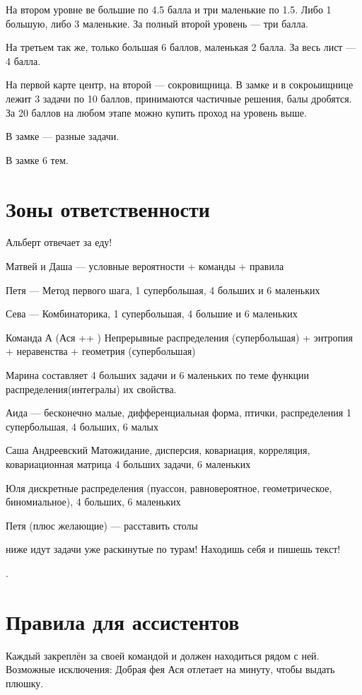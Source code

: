 \documentclass[a4paper,12pt]{article}
\begin{document}
 На втором уровне ве большие по 4.5 балла и три маленькие по 1.5. Либо 1 большую, либо 3 маленькие. 
 За полный второй уровень — три балла.

 На третьем так же, только большая 6 баллов, маленькая 2 балла. За весь лист — 4 балла.

 На первой карте центр, на второй — сокровищница. В замке и в сокроыищнице лежит 3 задачи по 10 баллов, 
 принимаются частичные решения, балы дробятся. За 20 баллов на любом этапе можно купить проход на уровень выше.

 В замке — разные задачи.

 В замке 6 тем. \\


\section*{Зоны ответственности}

Альберт отвечает за еду!

Матвей и Даша — условные вероятности + команды + правила

Петя — Метод первого шага, 1 супербольшая, 4 больших и 6 маленьких

Сева — Комбинаторика, 1 супербольшая, 4 большие и 6 маленьких

Команда А (Ася ++ ) Непрерывные распределения (супербольшая) + энтропия + неравенства + геометрия (супербольшая)

Марина составляет 4 больших задачи и 6 маленьких по теме функции распределения(интегралы) их свойства.

Аида — бесконечно малые, дифференциальная форма, птички, распределения 1 супербольшая, 4 больших, 6 малых

Саша Андреевский Матожидание, дисперсия, ковариация, корреляция, ковариационная матрица 4 больших задачи, 6 маленьких

Юля дискретные распределения (пуассон, равновероятное, геометрическое, биномиальное), 4 больших, 6 маленьких

Петя (плюс желающие) — расставить столы





ниже идут задачи уже раскинутые по турам! Находишь себя и пишешь текст!

\contentsname
\tableofcontents.

\section*{Правила для ассистентов}
Каждый закреплён за своей командой и должен находиться рядом с ней. Возможные исключения: Добрая фея Ася отлетает на минуту, чтобы выдать плюшку.
\end{document}
